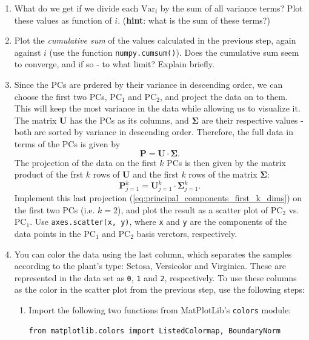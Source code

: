 \documentclass[12pt]{scrartcl}
\newcommand{\pyinl}[1]{\texttt{#1}}
\newcommand{\mtrx}[1]{\mathbf{#1}}
\newcommand{\PC}[1]{\mathrm{PC}_{#1}}
\newcommand{\var}[1]{\mathrm{Var}_{#1}}
\begin{document}
\begin{enumerate}
	      Plot the variance for each PC in descending order.
	\item What do we get if we divide each $\var{i}$ by the sum of all variance terms? Plot these values as function of $i$. (\textbf{hint}: what is the sum of these terms?)
	\item Plot the \textit{cumulative sum} of the values calculated in the previous step, again against $i$ (use the function \pyinl{numpy.cumsum()}). Does the cumulative sum seem to converge, and if so - to what limit? Explain briefly.
	\item Since the PCs are prdered by their variance in descending order, we can choose the first two PCs, $\PC{1}$ and $\PC{2}$, and project the data on to them. This will keep the most variance in the data while allowing us to visualize it. The matrix $\mtrx{U}$ has the PCs as its columns, and $\mtrx{\Sigma}$ are their respective values - both are sorted by variance in descending order. Therefore, the full data in terms of the PCs is given by
    \begin{equation}
        \mtrx{P} = \mtrx{U} \cdot \mtrx{\Sigma}.
        \label{eq:principal_components_US}
    \end{equation}
    The projection of the data on the first $k$ PCs is then given by the matrix product of the frst $k$ rows of $\mtrx{U}$ and the first $k$ rows of the matrix $\mtrx{\Sigma}$:
    \begin{equation}
        \mtrx{P}_{j=1}^{k} = \mtrx{U}_{j=1}^{k} \cdot \mtrx{\Sigma}_{j=1}^{k}.
        \label{eq:principal_components_first_k_dims}
    \end{equation}
    Implement this last projection (\autoref{eq:principal_components_first_k_dims}) on the first two PCs (i.e. $k=2$), and plot the result as a scatter plot of $\PC{2}$ vs. $\PC{1}$. Use \pyinl{axes.scatter(x, y)}, where \pyinl{x} and \pyinl{y} are the components of the data points in the $\PC{1}$ and $\PC{2}$ basis verctors, respectively.
    \item You can color the data using the last column, which separates the samples according to the plant's type: Setosa, Versicolor and Virginica. These are represented in the data set as \pyinl{0}, \pyinl{1} and \pyinl{2}, respectively. To use these columns as the color in the scatter plot from the previous step, use the following steps:
        \begin{enumerate}
            \item Import the following two functions from MatPlotLib's \pyinl{colors} module:
            \begin{verbatim}
from matplotlib.colors import ListedColormap, BoundaryNorm
            \end{verbatim}


\end{enumerate}
\end{enumerate}
\end{document}
